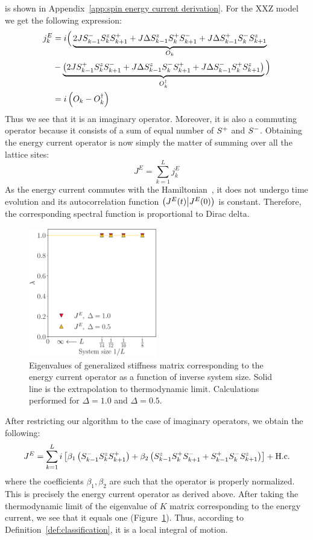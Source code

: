 is shown in Appendix~\ref{app:spin energy current derivation}. For the XXZ model we get the following expression:
\begin{align*}
  j_k^E & = i \Big( \underbrace{2J S^{-}_{k-1}S^{z}_k S^{+}_{k+1} + J \Delta S^{z}_{k-1}S^{+}_k S^{-}_{k+1} + J\Delta S^{+}_{k-1}S^{-}_kS^{z}_{k+1}}_{O_k}                                  \\
        & - \underbrace{\left(2J S^{+}_{k-1}S^{z}_k S^{-}_{k+1} + J\Delta S^{z}_{k-1}S^{-}_k S^{+}_{k+1} + J\Delta S^{-}_{k-1}S^{+}_{k} S^{z}_{k+1} \right)}_{O_k^{\dagger}}\Big) \nonumber \\
        & = i\left(O_k - O_k^{\dagger}\right)
\end{align*}
Thus we see that it is an imaginary operator. Moreover, it is also a commuting operator
because it consists of a sum of equal number of \(S^{+}{}\) and \(S^{-}{}\). 
Obtaining the energy current operator is now simply the matter of summing over all the lattice sites:
\begin{equation}
  J^E = \sum_{k=1}^L j_k^E
  \label{eq:energy current}
\end{equation}
As the energy current commutes with the Hamiltonian~\autocite{Zotos1997}, it does not undergo time evolution
and its autocorrelation function \(\left(J^E(t) \middle| J^E(0)\right)\) is constant. Therefore, the corresponding
spectral function is proportional to Dirac delta.
\begin{figure}[htbp]
  \centering
  \includegraphics[width=0.5\textwidth]{Figures/current_int.pdf}
  \caption{Eigenvalues of generalized stiffness matrix corresponding to the energy current
  operator as a function of inverse system size. Solid line is the extrapolation to thermodynamic
  limit. Calculations performed for \(\Delta=1.0\) and \(\Delta=0.5\).}\label{fig: current integrable}
\end{figure}
After restricting our algorithm to the case of imaginary
operators, we obtain the following:
\begin{equation}
    J^E = \sum_{k=1}^L i\left[\beta_1 \left(S^{-}_{k-1}S^{z}_{k}S^{+}_{k+1}\right) + \beta_2 \left(S^{z}_{k-1}S^{+}_{k}S^{-}_{k+1}+S^{+}_{k-1}S^{-}_{k}S^{z}_{k+1}\right)\right] + \text{H.c.}
\end{equation}
where the coefficients \(\beta_1,\beta_2\) are such that the operator is properly
normalized. This is precisely the energy current operator as derived above.
After taking the thermodynamic limit of the eigenvalue of \(K\) matrix 
corresponding to the energy current, we see that it equals one (Figure~\ref{fig: current integrable}).
Thus, according to Definition~\ref{def:classification}, it is a local integral of motion. 

